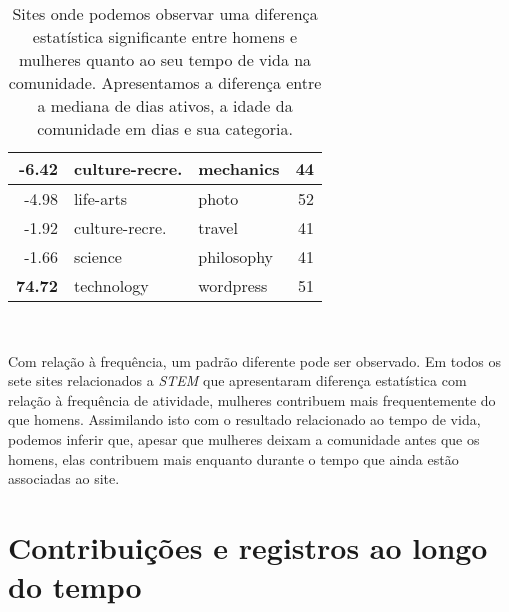 \begin{table}[Htbp]
\begin{tabular}{@{}rllr@{}}
-6.42                             & culture-recre. & mechanics          & 44                 \\ \midrule
-4.98                             & life-arts          & photo              & 52                 \\ \midrule
-1.92                             & culture-recre. & travel             & 41                 \\ \midrule
-1.66                             & science            & philosophy         & 41                 \\ \midrule
\textbf{74.72}                             & technology         & wordpress          & 51                 \\ \bottomrule
\end{tabular}
\caption[Diferença de tempo de vida entre homens e mulheres]{Sites onde podemos observar uma diferença estatística significante entre homens e mulheres quanto ao seu tempo de vida na comunidade. Apresentamos a diferença entre a mediana de dias ativos, a idade da comunidade em dias e sua categoria.}~\label{table:lifetime}
\end{table}


Com relação à frequência, um padrão diferente pode ser observado. Em todos os sete sites relacionados a \emph{STEM} que apresentaram diferença estatística com relação à frequência de atividade, mulheres contribuem mais frequentemente do que homens. Assimilando isto com o resultado relacionado ao tempo de vida, podemos inferir que, apesar que mulheres deixam a comunidade antes que os homens, elas contribuem mais enquanto durante o tempo que ainda estão associadas ao site.


\section{Contribuições e registros ao longo do tempo}

